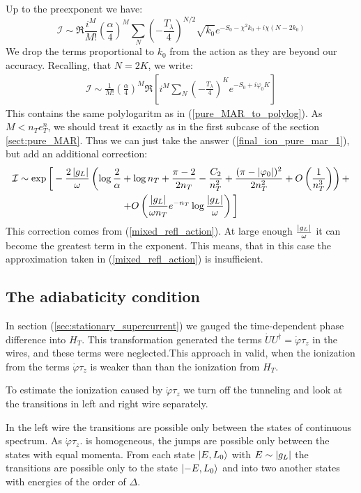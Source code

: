 Up to the preexponent we have:
\[
\mathcal{I}
\sim
\Re\frac{i^{M}}{M!}\left(\frac{\alpha}{4}\right)^{M}\sum_{N}\left(-\frac{T_{\lambda}}{4}\right)^{N/2}\sqrt{k_{0}}e^{-S_{0}-\chi^{2}k_{0}+i\chi(N-2k_{0})}
\]
We drop the terms proportional to $ k_0 $ from the action as they are beyond our accuracy. Recalling, that $ N=2K $, we write:
\begin{gather}
	\mathcal{I}
	\sim
	\frac{1}{M!}
	\left(\frac{\alpha}{4}\right)^{M}\Re
	\left[ i^{M}
	\sum_{N}
	\left(-\frac{T_{\lambda}}{4}\right)^{K}
	e^{-S_{0}+i\varphi_{0}K}
	\right]
\end{gather}
This contains the same polylogaritm as in (\ref{pure_MAR_to_polylog}). As $ M<n_Te^n_T $, we should treat it exactly as in the first subcase of the section \ref{sect:pure_MAR}. Thus we can just take the answer (\ref{final_ion_pure_mar_1}), but add an additional correction:
\begin{multline}
		\mathcal{I}
	\sim
	\exp
	\bigg[
		-
		\frac
		{2\left|g_L\right|}
		{\omega}
		\left(
			\log
			\frac{2}{\alpha}
			+
			\log n_T
			+
			\frac{\pi-2}{2n_T}
			-
			\frac{C_2}{n_T^2}
			+
			\frac{(\pi-|\varphi_{0}|)^{2}}{2n_T^{2}}
			+
			O\left(\frac{1}{n_T^3}\right)
		\right)
	+
	\\
	+
	O
	\left( 		\frac{\left|g_L\right|}{\omega n_T}
			e^{-n_T}
			\log\frac{\left|g_L\right|}{\omega}
	\right)		
	\bigg]
\end{multline}
This correction comes from (\ref{mixed_refl_action}). At large enough $ \frac{\left|g_L\right|}{\omega} $ it can become the greatest term in the exponent. This means, that in this case the approximation taken in (\ref{mixed_refl_action}) is insufficient.  

\subsection{The adiabaticity condition}
In section (\ref{sec:stationary_supercurrent}) we gauged the time-dependent phase difference into $ H_T $. This transformation generated the terms $ \dot{U}U^\dagger=\dot{\varphi}\tau_z $ in the wires, and these terms were neglected.This approach in valid, when the ionization from the terms $  \dot{\varphi}\tau_z $ is weaker than than the ionization from $ H_T$.

To estimate the ionization caused by $ \dot{\varphi}\tau_z $ we turn off the tunneling  and look at the transitions in left and right wire separately.

In the left wire the transitions are possible only between the states of continuous spectrum. As $ \dot{\varphi}\tau_z. $ is homogeneous, the jumps are possible only between the states with equal momenta. From each state $ \ket{E,L_0} $ with $ E\sim\left|g_L\right| $ the transitions are possible only to the state $ \ket{-E,L_0} $ and into two another states with energies of the order of $ \Delta $.

